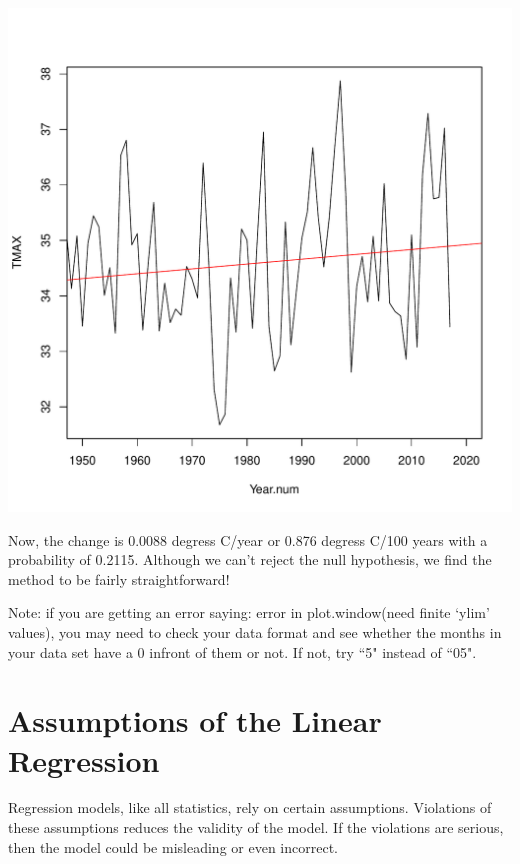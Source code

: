 \documentclass{article}\usepackage[]{graphicx}\usepackage[]{color}
\makeatletter
\def\maxwidth{ %
  \ifdim\Gin@nat@width>\linewidth
    \linewidth
  \else
    \Gin@nat@width
  \fi
}
\newenvironment{knitrout}{}{} %
\makeatother
\begin{document}
\begin{knitrout}
\includegraphics[width=\maxwidth]{figure/unnamed-chunk-7-1} 

\end{knitrout}

Now, the change is 0.0088 degress C/year or 0.876 degress C/100 years with a probability of 0.2115. Although we can't reject the null hypothesis, we find the method to be fairly straightforward! 


Note: if you are getting an error saying: error in plot.window(need finite `ylim' values), you may need to check your data format and see whether the months in your data set have a 0 infront of them or not. If not, try ``5" instead of ``05".



\section{Assumptions of the Linear Regression}

Regression models, like all statistics, rely on certain assumptions. Violations of these assumptions reduces the validity of the model. If the violations are serious, then the model could be misleading or even incorrect.
\end{document}
